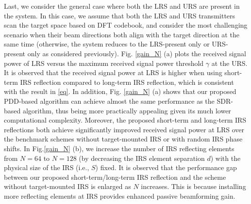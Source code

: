 \documentclass[10pt,final,doublecolumn]{IEEEtran}
\begin{document}
Last, we consider the general case where both the LRS and URS are present in the system. In this case, we assume that both the LRS and URS transmitters scan the target space based on DFT codebook, and consider the most challenging scenario when their beam directions both align with the target direction at the same time (otherwise, the system reduces to the LRS-present only or URS-present only as considered previously). Fig. \ref{gain_N} (a) plots the received signal power of LRS versus the maximum received signal power threshold $\gamma$ at the URS. It is observed that the received signal power at LRS is higher when using short-term IRS reflection compared to long-term IRS reflection, which is consistent with the result in \eqref{eq}. In addition, Fig. \ref{gain_N} (a) shows that our proposed PDD-based algorithm can achieve almost the same performance as the SDR-based algorithm, thus being more practically appealing given its much lower computational complexity. Moreover, the proposed short-term and long-term IRS reflections both achieve significantly improved received signal power at LRS over the benchmark schemes without target-mounted IRS or with random IRS phase shifts. In Fig.\ref{gain_N} (b), we increase the number of IRS reflecting elements from $N=64$ to $N=128$ (by decreasing the IRS element separation ${d}$) with the physical size of the IRS (i.e., $S$) fixed. It is observed that the performance gap between our proposed short-term/long-term IRS reflection and the scheme without target-mounted IRS is enlarged as $N$ increases. This is because installing more reflecting elements at IRS provides enhanced passive beamforming gain.
\end{document}
